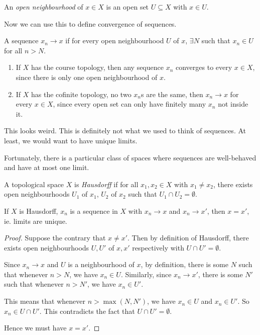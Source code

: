 \documentclass[a4paper]{article}
\begin{document}
\begin{defi}
  An \emph{open neighbourhood} of $x\in X$ is an open set $U\subseteq X$ with $x\in U$.
\end{defi}

Now we can use this to define convergence of sequences.
\begin{defi}
  A sequence $x_n \to x$ if for every open neighbourhood $U$ of $x$, $\exists N$ such that $x_n \in U$ for all $n > N$.
\end{defi}

\begin{eg}\leavevmode
  \begin{enumerate}
    \item If $X$ has the course topology, then any sequence $x_n$ converges to every $x\in X$, since there is only one open neighbourhood of $x$.
    \item If $X$ has the cofinite topology, no two $x_n$s are the same, then $x_n \to x$ for every $x\in X$, since every open set can only have finitely many $x_n$ not inside it.
  \end{enumerate}
\end{eg}

This looks weird. This is definitely not what we used to think of sequences. At least, we would want to have unique limits.

Fortunately, there is a particular class of spaces where sequences are well-behaved and have at most one limit.
\begin{defi}
  A topological space $X$ is \emph{Hausdorff} if for all $x_1, x_2\in X$ with $x_1 \not= x_2$, there exists open neighbourhoods $U_1$ of $x_1$, $U_2$ of $x_2$ such that $U_1 \cap U_2 = \emptyset$.
\end{defi}

\begin{lemma}
  If $X$ is Hausdorff, $x_n$ is a sequence in $X$ with $x_n \to x$ and $x_n \to x'$, then $x = x'$, ie. limits are unique.
\end{lemma}

\begin{proof}
  Suppose the contrary that $x\not= x'$. Then by definition of Hausdorff, there exists open neighbourhoods $U, U'$ of $x, x'$ respectively with $U \cap U' = \emptyset$.

  Since $x_n \to x$ and $U$ is a neighbourhood of $x$, by definition, there is some $N$ such that whenever $n > N$, we have $x_n \in U$. Similarly, since $x_n \to x'$, there is some $N'$ such that whenever $n > N'$, we have $x_n \in U'$.

  This means that whenever $n > \max(N, N')$, we have $x_n \in U$ and $x_n \in U'$. So $x_n \in U\cap U'$. This contradicts the fact that $U \cap U' = \emptyset$.

  Hence we must have $x = x'$.
\end{proof}
\end{document}
